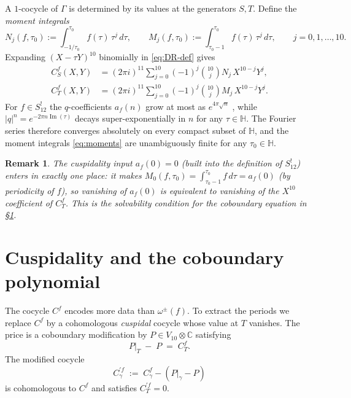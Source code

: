 \documentclass[11pt,letterpaper]{article}
\newtheorem{remark}[theorem]{Remark}
\newcommand{\HH}{\mathbb{H}}
\newcommand{\CC}{\mathbb{C}}
\DeclareMathOperator{\im}{Im}
\begin{document}
A $1$-cocycle of $\Gamma$ is determined by its values at the generators
$S, T$.  Define the \emph{moment integrals}
\begin{equation}\label{eq:moments}
  N_j(f, \tau_0) := \int_{-1/\tau_0}^{\tau_0}\! f(\tau)\,\tau^j\,d\tau,
  \qquad
  M_j(f, \tau_0) := \int_{\tau_0 - 1}^{\tau_0}\! f(\tau)\,\tau^j\,d\tau,
  \qquad j = 0, 1, \ldots, 10.
\end{equation}
Expanding $(X - \tau Y)^{10}$ binomially in \eqref{eq:DR-def} gives
\begin{align}
  C_S^f(X, Y) &= (2\pi i)^{11}\sum_{j=0}^{10}(-1)^j\binom{10}{j}N_j\,X^{10-j}Y^j,
              \label{eq:CS-explicit}\\
  C_T^f(X, Y) &= (2\pi i)^{11}\sum_{j=0}^{10}(-1)^j\binom{10}{j}M_j\,X^{10-j}Y^j.
              \label{eq:CT-explicit}
\end{align}
For $f \in S_{12}^!$ the $q$-coefficients $a_f(n)$ grow at most as
$e^{4\pi\sqrt{n}}$ \cite{Brown2017}, while $|q|^n = e^{-2\pi n\im(\tau)}$
decays super-exponentially in $n$ for any $\tau \in \HH$.  The Fourier
series therefore converges absolutely on every compact subset of $\HH$,
and the moment integrals \eqref{eq:moments} are unambiguously finite for
any $\tau_0 \in \HH$.

\begin{remark}\label{rem:cuspidality-input}
The cuspidality input $a_f(0) = 0$ (built into the definition of
$S_{12}^!$) enters in exactly one place: it makes $M_0(f, \tau_0)
= \int_{\tau_0-1}^{\tau_0}\! f\,d\tau = a_f(0)$ (by periodicity of $f$),
so vanishing of $a_f(0)$ is equivalent to vanishing of the $X^{10}$
coefficient of $C^f_T$.  This is the solvability condition for the
coboundary equation in \S\ref{sec:coboundary}.
\end{remark}

\section{Cuspidality and the coboundary polynomial}\label{sec:coboundary}

The cocycle $C^f$ encodes more data than $\omega^\pm(f)$.  To extract
the periods we replace $C^f$ by a cohomologous \emph{cuspidal} cocycle
whose value at $T$ vanishes.  The price is a coboundary modification by
$P \in V_{10}\otimes\CC$ satisfying
\begin{equation}\label{eq:P-equation}
  P\big|_T \;-\; P \;=\; C^f_T. \tag{$\star$}
\end{equation}
The modified cocycle
\begin{equation}\label{eq:Cprime-def}
  C^{\prime f}_\gamma \;:=\; C^f_\gamma - (P|_\gamma - P)
\end{equation}
is cohomologous to $C^f$ and satisfies $C^{\prime f}_T = 0$.
\end{document}

